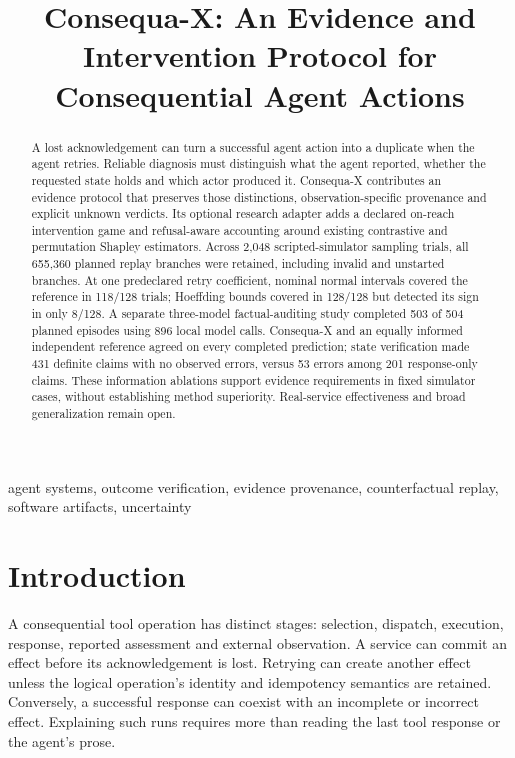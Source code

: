 \documentclass[conference]{IEEEtran}
\title{Consequa-X: An Evidence and Intervention Protocol for Consequential Agent Actions}
\author{\IEEEauthorblockN{Devrajsinh Jhala}\IEEEauthorblockA{Independent Researcher}}
\begin{document}
\raggedbottom
\maketitle

\begin{abstract}
A lost acknowledgement can turn a successful agent action into a duplicate
when the agent retries. Reliable diagnosis must distinguish what the agent
reported, whether the requested state holds and which actor produced it.
Consequa-X contributes an evidence protocol that preserves those distinctions,
observation-specific provenance and explicit unknown verdicts. Its optional
research adapter adds a declared on-reach intervention game and refusal-aware
accounting around existing contrastive and permutation Shapley estimators.
Across 2,048 scripted-simulator sampling trials, all 655,360 planned replay
branches were retained, including invalid and unstarted branches. At one
predeclared retry coefficient, nominal normal intervals covered the reference
in 118/128 trials; Hoeffding bounds covered in 128/128 but detected its sign in
only 8/128. A separate three-model factual-auditing study completed 503 of
504 planned episodes using 896 local model calls. Consequa-X and an equally
informed independent reference agreed on every completed prediction; state
verification made 431 definite claims with no observed errors, versus 53
errors among 201 response-only claims. These information ablations support
evidence requirements in fixed simulator cases, without establishing method
superiority. Real-service effectiveness and broad generalization remain open.
\end{abstract}

\begin{IEEEkeywords}
agent systems, outcome verification, evidence provenance, counterfactual replay,
software artifacts, uncertainty
\end{IEEEkeywords}

\section{Introduction}
A consequential tool operation has distinct stages: selection, dispatch,
execution, response, reported assessment and external observation. A service
can commit an effect before its acknowledgement is lost. Retrying can create
another effect unless the logical operation's identity and idempotency semantics
are retained. Conversely, a successful response can coexist with an incomplete
or incorrect effect. Explaining such runs requires more than reading the last
tool response or the agent's prose.
\end{document}

